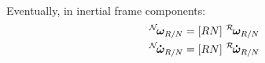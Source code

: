 \documentclass[]{AVSSimReportMemo}
\begin{document}
Eventually, in inertial frame components:
\begin{subequations}
	\begin{align}
		\leftexp{N} {\bm\omega_{R/N}} &= [RN] \textrm{ } \leftexp{R} {\bm\omega_{R/N}}
		\\
		\leftexp{N} {\bm{\dot\omega}_{R/N}} &= [RN]  \textrm{ } \leftexp{R} {\bm{\dot\omega}_{R/N}}
	\end{align}
\end{subequations}



\end{document}

